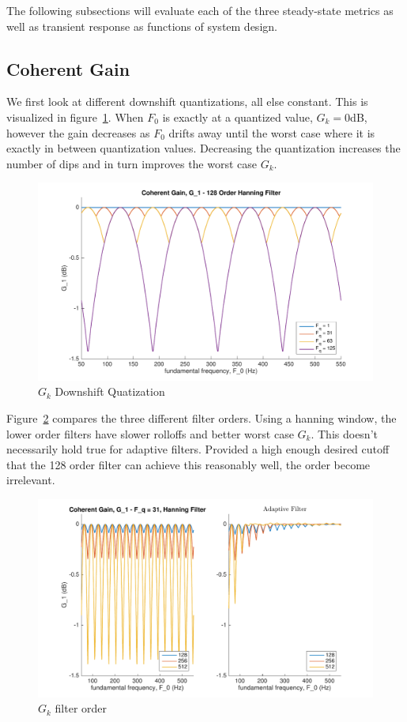 \documentclass [11pt, proquest,oneside] {ganter_thesis}[2015/03/03]
\begin{document}
The following subsections will evaluate each of the three steady-state metrics as well as transient response as functions of system design.

\subsection{Coherent Gain}

We first look at different downshift quantizations, all else constant.  This is visualized in figure~\ref{fig:g_k_1}.  When $F_0$ is exactly at a quantized value, $G_k = 0$dB, however the gain decreases as $F_0$ drifts away until the worst case where it is exactly in between quantization values.  Decreasing the quantization increases the number of dips and in turn improves the worst case $G_k$.

\begin{figure}[!ht]
  \centering
    \includegraphics[width=1\textwidth]{g_k_1}   
    \caption{$G_k$ Downshift Quatization}\label{fig:g_k_1}
\end{figure}

Figure~\ref{fig:g_k_2} compares the three different filter orders.  Using a hanning window, the lower order filters have slower rolloffs and better worst case $G_k$.  This doesn't necessarily hold true for adaptive filters.  Provided a high enough desired cutoff that the 128 order filter can achieve this reasonably well, the order become irrelevant.

\begin{figure}[!ht]
  \centering
    \includegraphics[width=.8\textwidth]{g_k_2}   
    \caption{$G_k$ filter order}\label{fig:g_k_2}
\end{figure}
\end{document}
